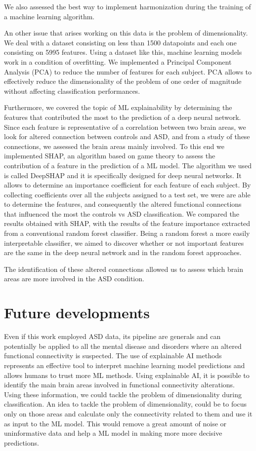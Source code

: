 \documentclass[11pt]{report}
\begin{document}
We also assessed the best way to implement harmonization during the training of a machine learning algorithm.

An other issue that arises working on this data is the problem of dimensionality.
We deal with a dataset consisting on less than 1500 datapoints and each one consisting on 5995 features.
Using a dataset like this, machine learning models work in a condition of overfitting. 
We implemented a Principal Component Analysis (PCA) to reduce the number of features for each subject.
PCA allows to effectively reduce the dimensionality of the problem of one order of magnitude without affecting classification performances.


Furthermore, we covered the topic of ML explainability by determining the features that contributed the most to the prediction of a deep neural network.
Since each feature is representative of a correlation between two brain areas, we look for altered connection between controls and ASD, and from a study of these connections, we assessed the brain areas mainly involved.
To this end we implemented SHAP, an algorithm based on game theory to assess the contribution of a feature in the prediction of a ML model.
The algorithm we used is called DeepSHAP and it is specifically designed for deep neural networks. 
It allows to determine an importance coefficient for each feature of each subject.
By collecting coefficients over all the subjects assigned to a test set, we were are able to determine the features, and consequently the altered functional connections that influenced the most the controls vs ASD classification.
We compared the results obtained with SHAP, with the results of the feature importance extracted from a conventional random forest classifier.
Being a random forest a more easily interpretable classifier, we aimed to discover whether or not important features are the same in the deep neural network and in the random forest approaches.

The identification of these altered connections allowed us to assess which brain areas are more involved in the ASD condition. 

\section*{Future developments}

Even if this work employed ASD data, its pipeline are generals and can potentially be applied to all the mental disease and disorders where an altered functional connectivity is suspected.
The use of explainable AI methods represents an effective tool to interpret machine learning model predictions and allows humans to trust more ML methods.
Using explainable AI, it is possible to identify the main brain areas involved in functional connectivity alterations. 
Using these information, we could tackle the problem of dimensionality during classification.
An idea to tackle the problem of dimensionality, could be to focus only on those areas and calculate only the connectivity related to them and use it as input to the ML model.
This would remove a great amount of noise or uninformative data and help a ML model in making more more decisive predictions.
\end{document}

